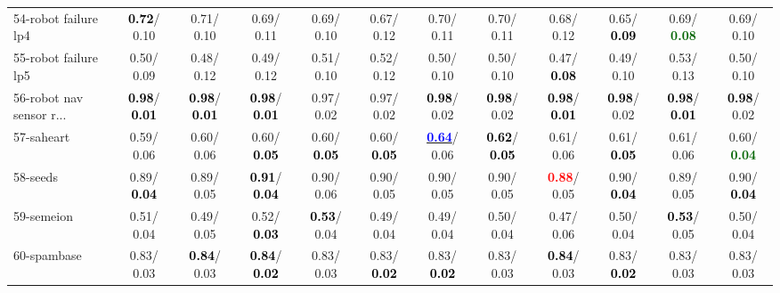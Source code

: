 \begin{table}[h]
\begin{center}
{\begin{tabular}{lc|c|c|c|c|c|c|c|c|c|c}
54-robot failure lp4 & \textcolor{black}{\textbf{  0.72}}/  0.10 &   0.71/  0.10 &   0.69/  0.11 &   0.69/  0.10 &   0.67/  0.12 &   0.70/  0.11 &   0.70/  0.11 &   0.68/  0.12 &   0.65/\textcolor{black}{\textbf{  0.09}} &   0.69/\textcolor{darkgreen}{\textbf{  0.08}} &   0.69/  0.10 \\
55-robot failure lp5 &   0.50/  0.09 &   0.48/  0.12 &   0.49/  0.12 &   0.51/  0.10 &   0.52/  0.12 &   0.50/  0.10 &   0.50/  0.10 &   0.47/\textcolor{black}{\textbf{  0.08}} &   0.49/  0.10 &   0.53/  0.13 &   0.50/  0.10 \\
56-robot nav sensor r... & \textcolor{black}{\textbf{  0.98}}/\textcolor{black}{\textbf{  0.01}} & \textcolor{black}{\textbf{  0.98}}/\textcolor{black}{\textbf{  0.01}} & \textcolor{black}{\textbf{  0.98}}/\textcolor{black}{\textbf{  0.01}} &   0.97/  0.02 &   0.97/  0.02 & \textcolor{black}{\textbf{  0.98}}/  0.02 & \textcolor{black}{\textbf{  0.98}}/  0.02 & \textcolor{black}{\textbf{  0.98}}/\textcolor{black}{\textbf{  0.01}} & \textcolor{black}{\textbf{  0.98}}/  0.02 & \textcolor{black}{\textbf{  0.98}}/\textcolor{black}{\textbf{  0.01}} & \textcolor{black}{\textbf{  0.98}}/  0.02 \\
57-saheart &   0.59/  0.06 &   0.60/  0.06 &   0.60/\textcolor{black}{\textbf{  0.05}} &   0.60/\textcolor{black}{\textbf{  0.05}} &   0.60/\textcolor{black}{\textbf{  0.05}} & \underline{\textcolor{blue}{\textbf{  0.64}}}/  0.06 & \textcolor{black}{\textbf{  0.62}}/\textcolor{black}{\textbf{  0.05}} &   0.61/  0.06 &   0.61/\textcolor{black}{\textbf{  0.05}} &   0.61/  0.06 &   0.60/\textcolor{darkgreen}{\textbf{  0.04}} \\
58-seeds &   0.89/\textcolor{black}{\textbf{  0.04}} &   0.89/  0.05 & \textcolor{black}{\textbf{  0.91}}/\textcolor{black}{\textbf{  0.04}} &   0.90/  0.06 &   0.90/  0.05 &   0.90/  0.05 &   0.90/  0.05 & \textcolor{red}{\textbf{  0.88}}/  0.05 &   0.90/\textcolor{black}{\textbf{  0.04}} &   0.89/  0.05 &   0.90/\textcolor{black}{\textbf{  0.04}} \\
59-semeion &   0.51/  0.04 &   0.49/  0.05 &   0.52/\textcolor{black}{\textbf{  0.03}} & \textcolor{black}{\textbf{  0.53}}/  0.04 &   0.49/  0.04 &   0.49/  0.04 &   0.50/  0.04 &   0.47/  0.06 &   0.50/  0.04 & \textcolor{black}{\textbf{  0.53}}/  0.05 &   0.50/  0.04 \\
60-spambase &   0.83/  0.03 & \textcolor{black}{\textbf{  0.84}}/  0.03 & \textcolor{black}{\textbf{  0.84}}/\textcolor{black}{\textbf{  0.02}} &   0.83/  0.03 &   0.83/\textcolor{black}{\textbf{  0.02}} &   0.83/\textcolor{black}{\textbf{  0.02}} &   0.83/  0.03 & \textcolor{black}{\textbf{  0.84}}/  0.03 &   0.83/\textcolor{black}{\textbf{  0.02}} &   0.83/  0.03 &   0.83/  0.03 \\ \hline

\end{tabular}}
\end{center}
\end{table}
